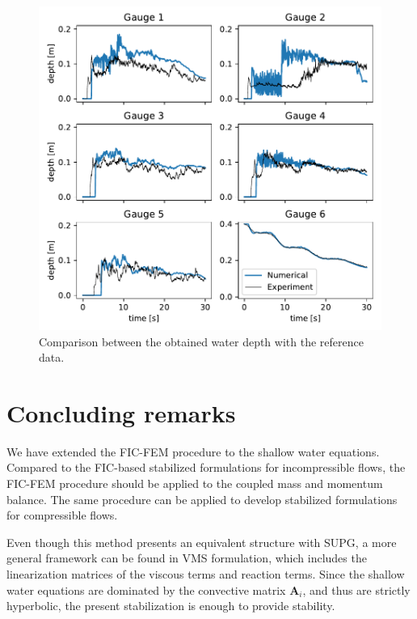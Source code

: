 \documentclass[a4paper,12pt]{article}
\newcommand\Miguel[1]{\ifthenelse{\boolean{show_comments}}{\textcolor{red}{#1}}{}}
\begin{document}
\begin{figure}
\centering
\includegraphics[width=\textwidth]{img/exp/gauges.pdf}
\caption{Comparison between the obtained water depth with the reference data.}
\label{experiment_gauges}
\end{figure}



\section{Concluding remarks} \label{sec:conclusions}

We have extended the FIC-FEM procedure to the shallow water equations. Compared to the FIC-based stabilized formulations for incompressible flows, the FIC-FEM procedure should be applied to the coupled mass and momentum balance. The same procedure can be applied to develop stabilized formulations for compressible flows.\Miguel{NO SE SI S'ENTÉN AIXÒ: QUE NO ES POT ESTABILITZAR EL MOMENT PER UNA BANDA I LA MASSA PER L'ALTRA BANDA}

Even though this method presents an equivalent structure with SUPG, a more general framework can be found in VMS formulation, which includes the linearization matrices of the viscous terms and reaction terms. Since the shallow water equations are dominated by the convective matrix $\mathbf{A}_i$, and thus are strictly hyperbolic, the present stabilization is enough to provide stability.
\end{document}
